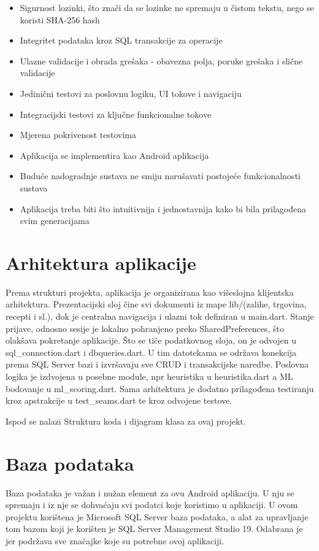 \documentclass[diplomskirad]{fer}
\begin{document}
\begin{itemize}
    \item Sigurnost lozinki, što znači da se lozinke ne spremaju u čistom tekstu, nego se koristi SHA-256 hash
    \item Integritet podataka kroz SQL transakcije za operacije
    \item Ulazne validacije i obrada grešaka - obavezna polja, poruke grešaka i slične validacije
    \item Jedinični testovi za poslovnu logiku, UI tokove i navigaciju
    \item Integracijski testovi za ključne funkcionalne tokove
    \item Mjerena pokrivenost testovima
    \item Aplikacija se implementira kao Android aplikacija 
    \item Buduće nadogradnje sustava ne smiju narušavati postojeće funkcionalnosti sustava
    \item Aplikacija treba biti što intuitivnija i jednostavnija kako bi bila prilagođena svim generacijama
\end{itemize}

\section{Arhitektura aplikacije}
Prema strukturi projekta, aplikacija je organizirana kao višeslojna klijentska arhitektura. Prezentacijski sloj čine svi dokumenti iz mape lib/(zalihe, trgovina, recepti i sl.), dok je centralna navigacija i ulazni tok definiran u main.dart. Stanje prijave, odnosno sesije je lokalno pohranjeno preko SharedPreferences, što olakšava pokretanje aplikacije. Što se tiče podatkovnog sloja, on je odvojen u sql\_connection.dart i dbqueries.dart. U tim datotekama se održava konekcija prema SQL Server bazi i izvršavaju sve CRUD i transakcijske naredbe. Poslovna logika je izdvojena u posebne module, npr heuristika u heuristika.dart a ML bodovanje u ml\_scoring.dart. Sama arhitektura je dodatno prilagođena testiranju kroz apstrakcije u test\_seams.dart te kroz odvojene testove. 

Ispod se nalazi Struktura koda i dijagram klasa za ovaj projekt.

\section{Baza podataka}
Baza podataka je važan i nužan element za ovu Android aplikaciju. U nju se spremaju i iz nje se dohvaćaju svi podatci koje koristimo u aplikaciji. U ovom projektu korištena je Microsoft SQL Server baza podataka, a alat za upravljanje tom bazom koji je korišten je SQL Server Management Studio 19. Odabrana je jer podržava sve značajke koje su potrebne ovoj aplikaciji.
\end{document}
